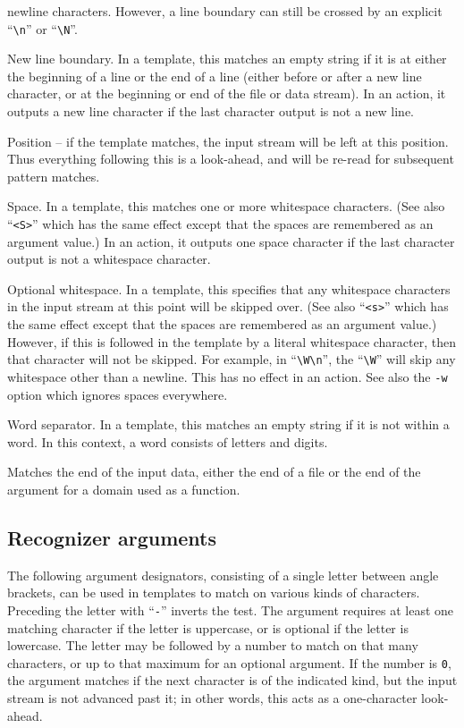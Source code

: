 \begin{description}
newline characters.  However, a line boundary can still be crossed by an
explicit ``\verb/\n/'' or ``\verb/\N/''.
\item[{\tt $\backslash$N}]
New line boundary.
In a template, this matches an empty string if it is at either the
beginning of a line or the end of a line (either before or after a new
line character, or at the beginning or end of the file or data stream).
In an action, it outputs a new line character if the last character
output is not a new line.
\item[{\tt $\backslash$P}]
Position -- if the template matches, the input stream will be left at
this position.  Thus everything following this is a look-ahead, and will
be re-read for subsequent pattern matches.
\item[{\tt $\backslash$S}]
Space.  In a template, this matches one or more whitespace characters.
(See also ``\verb/<S>/'' which has the same effect except that the
spaces are remembered as an argument value.)
In an action, it outputs one space character if the last character
output is not a whitespace character.
\item[{\tt $\backslash$W}]
Optional whitespace.  In a template, this specifies that any whitespace
characters in the input stream at this point will be skipped over.
(See also ``\verb/<s>/'' which has the same effect except that the
spaces are remembered as an argument value.)
However, if this is followed in the template by a literal whitespace
character, then that character will not be skipped.  For example, in
``\verb/\W\n/'', the ``\verb/\W/'' will skip any whitespace other than a
newline. 
This has no effect in an action.
See also the \verb/-w/ option which ignores spaces everywhere.
\item[{\tt $\backslash$X}]
Word separator.  In a template, this matches an empty string if it is
not within a word.  In this context, a word consists of letters and digits.
\item[{\tt $\backslash$Z}]
Matches the end of the input data, either the end of a file
or the end of the argument for a domain used as a function.
\end{description}


\subsection{Recognizer arguments}
The following argument designators, consisting of a single letter between
angle brackets, can be used in templates to match on
various kinds of characters.  Preceding the letter with
``\verb|-|''
inverts the test.  The argument requires at least one matching character
if the letter is uppercase, or is optional if the letter is lowercase.
The letter may be followed by a number to match on that many
characters, or up to that maximum for an optional argument.  If the
number is {\tt 0},
the argument matches if the next character is of the
indicated kind, but the input stream is not advanced past it; in other
words, this acts as a one-character look-ahead.

